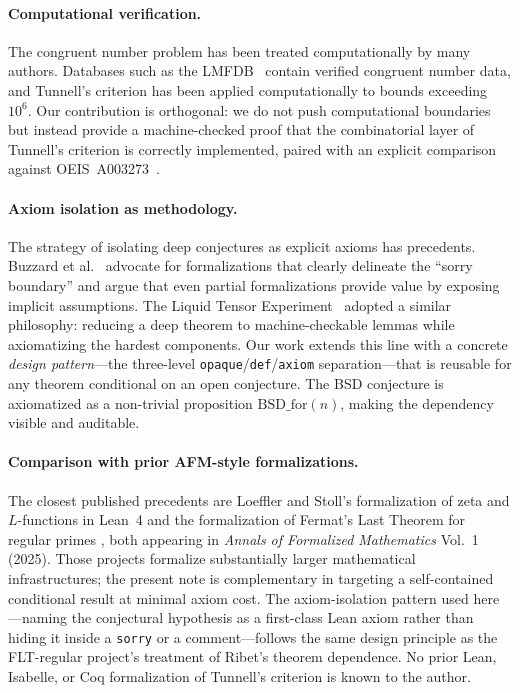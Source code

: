 \documentclass[11pt,a4paper]{article}
\theoremstyle{definition}
\newcommand{\lean}[1]{\texttt{#1}}
\newcommand{\BSDfor}{\mathrm{BSD\_for}}
\begin{document}
\paragraph{Computational verification.}
The congruent number problem has been treated computationally by many
authors.  Databases such as the LMFDB~\cite{LMFDB2024} contain
verified congruent number data, and Tunnell's criterion has been
applied computationally to bounds exceeding~$10^6$.  Our contribution is orthogonal: we do not push
computational boundaries but instead provide a machine-checked proof
that the combinatorial layer of Tunnell's criterion is correctly
implemented, paired with an explicit comparison against
OEIS~A003273~\cite{OEIS_A003273}.

\paragraph{Axiom isolation as methodology.}
The strategy of isolating deep conjectures as explicit axioms has
precedents.  Buzzard et al.~\cite{BuzzardEtAl2020} advocate for
formalizations that clearly delineate the ``sorry boundary'' and
argue that even partial formalizations provide value by exposing
implicit assumptions.  The Liquid Tensor Experiment~\cite{Scholze2022}
adopted a similar philosophy: reducing a deep theorem to
machine-checkable lemmas while axiomatizing the hardest components.
Our work extends this line with a concrete \emph{design pattern}---the
three-level \lean{opaque}/\lean{def}/\lean{axiom} separation---that
is reusable for any theorem conditional on an open conjecture.
The BSD conjecture is axiomatized as a non-trivial proposition
$\BSDfor(n)$, making the dependency visible and auditable.

\paragraph{Comparison with prior AFM-style formalizations.}
The closest published precedents are Loeffler and Stoll's
formalization of zeta and $L$-functions in Lean~4
\cite{LoefflerStoll2025} and the formalization of Fermat's Last
Theorem for regular primes \cite{FLTregular2025}, both appearing
in \emph{Annals of Formalized Mathematics} Vol.~1 (2025).  Those
projects formalize substantially larger mathematical
infrastructures; the present note is complementary in targeting a
self-contained conditional result at minimal axiom cost.  The
axiom-isolation pattern used here---naming the conjectural
hypothesis as a first-class Lean axiom rather than hiding it
inside a \texttt{sorry} or a comment---follows the same design
principle as the FLT-regular project's treatment of Ribet's
theorem dependence.  No prior Lean, Isabelle, or Coq formalization
of Tunnell's criterion is known to the author.
\end{document}
